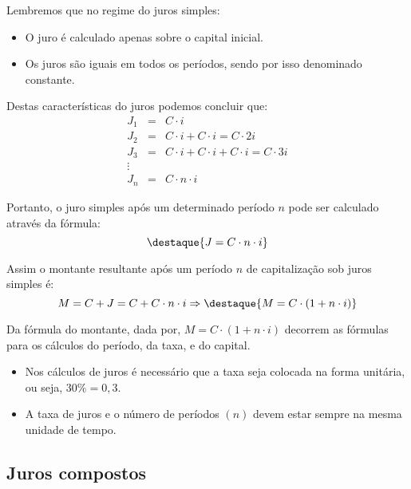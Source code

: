  Lembremos que no regime do juros simples:
 \begin{itemize}
  \item O juro é calculado apenas sobre o capital inicial.
  \item Os juros são iguais em todos os períodos, sendo por isso denominado constante.
 \end{itemize}
 
 Destas características do juros podemos concluir que:
  \begin{eqnarray*}
  J_1&=& C\cdot i \\
  J_2&=& C\cdot i + C\cdot i= C\cdot 2i \\
  J_3&=& C\cdot i + C\cdot i + C\cdot i= C\cdot 3i \\
  \vdots \\
  J_n&=& C \cdot n \cdot i
  \end{eqnarray*}
 
 Portanto, o juro simples após um determinado período $n$ pode ser calculado através da fórmula:
  \[\destaque{J= C \cdot n \cdot i}\]
 
 Assim o montante resultante após um período $n$ de capitalização sob juros simples é:
 \[M= C + J = C + C \cdot n \cdot i \Rightarrow \destaque{M=  C \cdot (1 + n \cdot i)}\]
 
 Da fórmula do montante, dada por, $M= C \cdot (1 + n \cdot i)$ decorrem as fórmulas para os cálculos do período, da taxa, e do capital.
 \begin{obs}
 \begin{itemize}
  \item Nos cálculos de juros é necessário que a taxa seja colocada na forma unitária, ou seja, $30 \%= 0,3$.
  \item A taxa de juros e o número de períodos $(n)$ devem estar sempre na mesma unidade de tempo.
 \end{itemize} 
 \end{obs}


 
 \subsection{Juros compostos}
 
